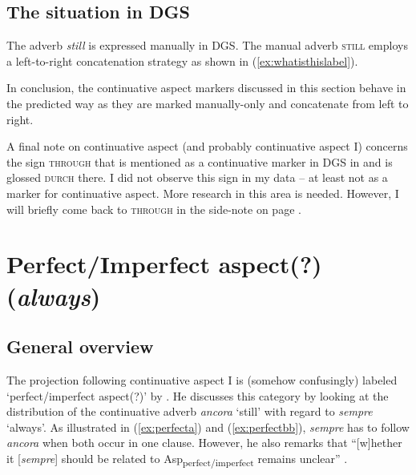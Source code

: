\subsection{The situation in DGS}
The adverb \textit{still} is expressed manually in DGS. The manual adverb \textsc{still} employs a left-to-right concatenation strategy as shown in (\ref{ex:whatisthislabel}).

\begin{exe}
\ex\label{ex:whatisthislabel}\begin{xlist} 
\end{xlist}
\end{exe}




\noindent In conclusion, the continuative aspect markers discussed in this section behave in the predicted way as they are marked manually-only and concatenate from left to right.

A final note on continuative aspect (and probably continuative aspect I) concerns the sign \textsc{through} that is mentioned as a continuative marker in DGS in \citet[259]{rathmann2005event} and is glossed \textsc{durch} there. I did not observe this sign in my data -- at least not as a marker for continuative aspect. More research in this area is needed. However, I will briefly come back to \textsc{through} in the side-note on page \pageref{exkursfertigdurch}.




\section{Perfect/Imperfect aspect(?) (\textit{always})}
\subsection{General overview}
The projection following continuative aspect I is (somehow confusingly) labeled `perfect/imperfect aspect(?)' by \citet[96]{cinque1999adverbs}. He discusses this category by looking at the distribution of the continuative adverb \textit{ancora} `still' with regard to \textit{sempre} `always'. As illustrated in (\ref{ex:perfecta}) and (\ref{ex:perfectbb}), \textit{sempre} has to follow \textit{ancora} when both occur in one clause. However, he also remarks that ``[w]hether it [\textit{sempre}] should be related to Asp\textsubscript{perfect/imperfect} remains unclear'' \citep[96]{cinque1999adverbs}. 

